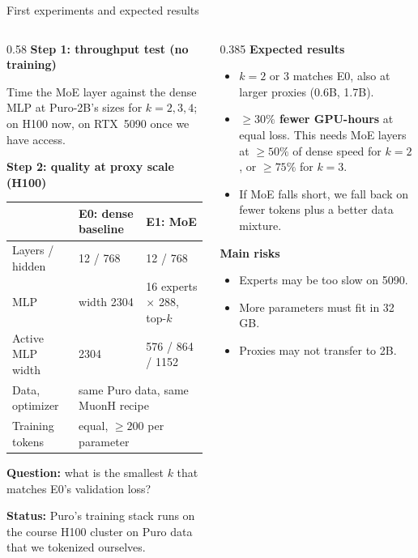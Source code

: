 \documentclass[aspectratio=169,10pt]{beamer}
\newcommand{\hl}[1]{\textcolor{accent}{\textbf{#1}}}
\newcommand{\head}[1]{\textbf{#1}\par\smallskip}
\begin{document}
\begin{frame}[t]{First experiments and expected results}
\begin{columns}[T,onlytextwidth]
\begin{column}{0.58\textwidth}
\head{Step 1: throughput test (no training)}
Time the MoE layer against the dense MLP at Puro-2B's sizes for
$k = 2, 3, 4$; on H100 now, on RTX~5090 once we have access.

\medskip
\head{Step 2: quality at proxy scale (H100)}
{\footnotesize\setlength{\tabcolsep}{3pt}
\begin{tabular}{@{}lll@{}}
\toprule
 & \textbf{E0: dense baseline} & \textbf{E1: MoE} \\
\midrule
Layers / hidden & 12 / 768 & 12 / 768 \\
MLP & width 2304 & 16 experts $\times$ 288, top-$k$ \\
Active MLP width & 2304 & 576 / 864 / 1152 \\
Data, optimizer & \multicolumn{2}{l}{same Puro data, same MuonH recipe} \\
Training tokens & \multicolumn{2}{l}{equal, $\ge 200$ per parameter} \\
\bottomrule
\end{tabular}}

\smallskip
\textbf{Question:} what is the smallest $k$ that matches E0's validation
loss?

\medskip
{\small\textbf{Status:} Puro's training stack runs on the course H100
cluster on Puro data that we tokenized ourselves.}
\end{column}
\begin{column}{0.385\textwidth}
\head{Expected results}
\begin{itemize}\setlength{\itemsep}{2pt}
\item $k = 2$ or $3$ matches E0, also at larger proxies (0.6B, 1.7B).
\item \hl{$\ge 30\%$ fewer GPU-hours} at equal loss. This needs MoE layers
      at $\ge 50\%$ of dense speed for $k=2$, or $\ge 75\%$ for $k=3$.
\item If MoE falls short, we fall back on fewer tokens plus a better data
      mixture.
\end{itemize}

\smallskip
\head{Main risks}
{\small
\begin{itemize}\setlength{\itemsep}{1pt}
\item Experts may be too slow on 5090.
\item More parameters must fit in 32\,GB.
\item Proxies may not transfer to 2B.
\end{itemize}}
\end{column}
\end{columns}
\end{frame}
\end{document}
